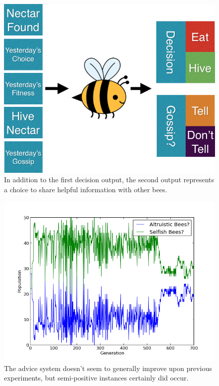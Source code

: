 \documentclass[11pt]{article}
\begin{document}
			\begin{figure}[tbph!]
				\begin{center}
					\includegraphics[scale=.5]{bee_diagrams/gossip_system.png}
				\end{center}
				\caption{In addition to the first decision output, the second output represents a choice to share helpful information with other bees.}
				\label{fig:gossip_system}
			\end{figure}

                        \begin{figure}[tbph!]
				\begin{center}
					\includegraphics[scale=.5]{results/gossip_plot_twist_comp.png}
				\end{center}
				\caption{The advice system doesn't seem to generally improve upon previous experiments, but semi-positive instances certainly did occur.}
				\label{fig:gossip_composition}
			\end{figure}
\end{document}
